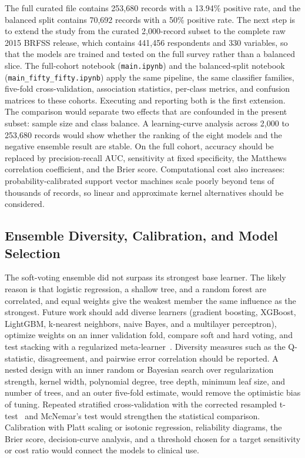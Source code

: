 \documentclass[conference]{IEEEtran}
\begin{document}
The full curated file contains 253,680 records with a 13.94\% positive rate, and the balanced split contains 70,692 records with a 50\% positive rate. The next step is to extend the study from the curated 2,000-record subset to the complete raw 2015 BRFSS release, which contains 441,456 respondents and 330 variables, so that the models are trained and tested on the full survey rather than a balanced slice. The full-cohort notebook (\texttt{main.ipynb}) and the balanced-split notebook (\texttt{main\_fifty\_fifty.ipynb}) apply the same pipeline, the same classifier families, five-fold cross-validation, association statistics, per-class metrics, and confusion matrices to these cohorts. Executing and reporting both is the first extension. The comparison would separate two effects that are confounded in the present subset: sample size and class balance. A learning-curve analysis across 2,000 to 253,680 records would show whether the ranking of the eight models and the negative ensemble result are stable. On the full cohort, accuracy should be replaced by precision-recall AUC, sensitivity at fixed specificity, the Matthews correlation coefficient, and the Brier score. Computational cost also increases: probability-calibrated support vector machines scale poorly beyond tens of thousands of records, so linear and approximate kernel alternatives should be considered.

\subsection{Ensemble Diversity, Calibration, and Model Selection}

The soft-voting ensemble did not surpass its strongest base learner. The likely reason is that logistic regression, a shallow tree, and a random forest are correlated, and equal weights give the weakest member the same influence as the strongest. Future work should add diverse learners (gradient boosting, XGBoost, LightGBM, k-nearest neighbors, naive Bayes, and a multilayer perceptron), optimize weights on an inner validation fold, compare soft and hard voting, and test stacking with a regularized meta-learner~\cite{wolpert1992stacked}. Diversity measures such as the Q-statistic, disagreement, and pairwise error correlation should be reported. A nested design with an inner random or Bayesian search over regularization strength, kernel width, polynomial degree, tree depth, minimum leaf size, and number of trees, and an outer five-fold estimate, would remove the optimistic bias of tuning. Repeated stratified cross-validation with the corrected resampled t-test~\cite{dietterich1998approximate} and McNemar's test would strengthen the statistical comparison. Calibration with Platt scaling or isotonic regression, reliability diagrams, the Brier score, decision-curve analysis, and a threshold chosen for a target sensitivity or cost ratio would connect the models to clinical use.
\end{document}
